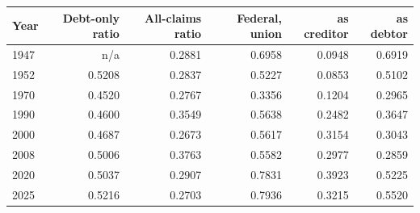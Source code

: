\begin{tabular}{lrrrrr}
\toprule
Year & Debt-only ratio & All-claims ratio & Federal, union & \quad as creditor & \quad as debtor \\
\midrule
1947 & n/a & 0.2881 & 0.6958 & 0.0948 & 0.6919 \\
1952 & 0.5208 & 0.2837 & 0.5227 & 0.0853 & 0.5102 \\
1970 & 0.4520 & 0.2767 & 0.3356 & 0.1204 & 0.2965 \\
1990 & 0.4600 & 0.3549 & 0.5638 & 0.2482 & 0.3647 \\
2000 & 0.4687 & 0.2673 & 0.5617 & 0.3154 & 0.3043 \\
2008 & 0.5006 & 0.3763 & 0.5582 & 0.2977 & 0.2859 \\
2020 & 0.5037 & 0.2907 & 0.7831 & 0.3923 & 0.5225 \\
2025 & 0.5216 & 0.2703 & 0.7936 & 0.3215 & 0.5520 \\
\bottomrule
\end{tabular}
